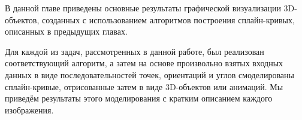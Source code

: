 В данной главе приведены основные результаты графической визуализации 3D-объектов, созданных с использованием
алгоритмов построения сплайн-кривых, описанных в предыдущих главах.

Для каждой из задач, рассмотренных в данной работе, был реализован соответствующий алгоритм, а затем на основе
произвольно взятых входных данных в виде последовательностей точек, ориентаций и углов смоделированы сплайн-кривые,
отрисованные затем в виде 3D-объектов или анимаций. Мы приведём результаты этого моделирования с кратким описанием
каждого изображения.
